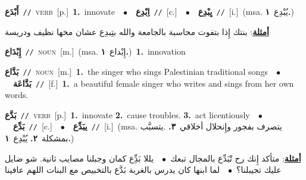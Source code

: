 \documentclass[10pt,a4paper,twoside]{article} %
\begin{document}
\begin{multicols}{2}
{\setlength\topsep{0pt}\textbf{\foreignlanguage{arabic}{أَبْدَع}}\ {\color{gray}\texttt{//}\color{black}}\ \textsc{verb}\ [p.]\ \textbf{1.}~innovate\ \ $\bullet$\ \ \setlength\topsep{0pt}\textbf{\foreignlanguage{arabic}{اِبْدِع}}\ {\color{gray}\texttt{//}\color{black}}\ [c.]\ \ $\bullet$\ \ \setlength\topsep{0pt}\textbf{\foreignlanguage{arabic}{يِبْدِع}}\ {\color{gray}\texttt{//}\color{black}}\ [i.]\ \color{gray}(msa. \foreignlanguage{arabic}{يُبْدِع}~\foreignlanguage{arabic}{\textbf{١.}})\color{black}\  \begin{flushright}\color{gray}\foreignlanguage{arabic}{\textbf{\underline{\foreignlanguage{arabic}{أمثلة}}}: بنتك إِذا بتفوت محاسبة بالجامعة والله بتِبدِع عشان مخها نظيف ودريسة}\end{flushright}\color{black}} \vspace{2mm}

{\setlength\topsep{0pt}\textbf{\foreignlanguage{arabic}{إِبْدَاع}}\ {\color{gray}\texttt{//}\color{black}}\ \textsc{noun}\ [m.]\ \color{gray}(msa. \foreignlanguage{arabic}{إِبْداع}~\foreignlanguage{arabic}{\textbf{١.}})\color{black}\ \textbf{1.}~innovation\ } \vspace{2mm}

{\setlength\topsep{0pt}\textbf{\foreignlanguage{arabic}{بَدَّاع}}\ {\color{gray}\texttt{//}\color{black}}\ \textsc{noun}\ [m.]\ \textbf{1.}~the singer who sings Palestinian traditional songs\ \ $\bullet$\ \ \setlength\topsep{0pt}\textbf{\foreignlanguage{arabic}{بَدَّاعَة}}\ {\color{gray}\texttt{//}\color{black}}\ [f.]\ \textbf{1.}~a beautiful female singer who writes and sings from her own words.\ } \vspace{2mm}

{\setlength\topsep{0pt}\textbf{\foreignlanguage{arabic}{بَدَّع}}\ {\color{gray}\texttt{//}\color{black}}\ \textsc{verb}\ [p.]\ \textbf{1.}~innovate  \textbf{2.}~cause troubles.  \textbf{3.}~act licentiously\ \ $\bullet$\ \ \setlength\topsep{0pt}\textbf{\foreignlanguage{arabic}{بَدِّع}}\ {\color{gray}\texttt{//}\color{black}}\ [c.]\ \ $\bullet$\ \ \setlength\topsep{0pt}\textbf{\foreignlanguage{arabic}{يبَدِّع}}\ {\color{gray}\texttt{//}\color{black}}\ [i.]\ \color{gray}(msa. \foreignlanguage{arabic}{يتصرف بفجور وإِنحلال أخلاقي}~\foreignlanguage{arabic}{\textbf{٣.}}  .\foreignlanguage{arabic}{يتسبَّب بمشكلة}~\foreignlanguage{arabic}{\textbf{٢.}}  \foreignlanguage{arabic}{يُبْدِع}~\foreignlanguage{arabic}{\textbf{١.}})\color{black}\  \begin{flushright}\color{gray}\foreignlanguage{arabic}{\textbf{\underline{\foreignlanguage{arabic}{أمثلة}}}: متأكد إِنك رح تْبَدِّع بالمجال تبعك\ $\bullet$\ \  يللا بَدِِّع كمان وجبلنا مصايب ثانية. شو ضايل عليك تجيبلنا؟\ $\bullet$\ \  لما ابنها كان يدرس بالغربة بَدَّع بالتخبيص مع البنات اللهم عافينا}\end{flushright}\color{black}} \vspace{2mm}


\end{multicols}
\end{document}
